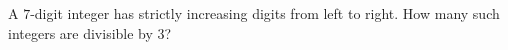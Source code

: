 A $7$-digit integer has strictly increasing digits from left to right. How many such integers are divisible by $3$?
